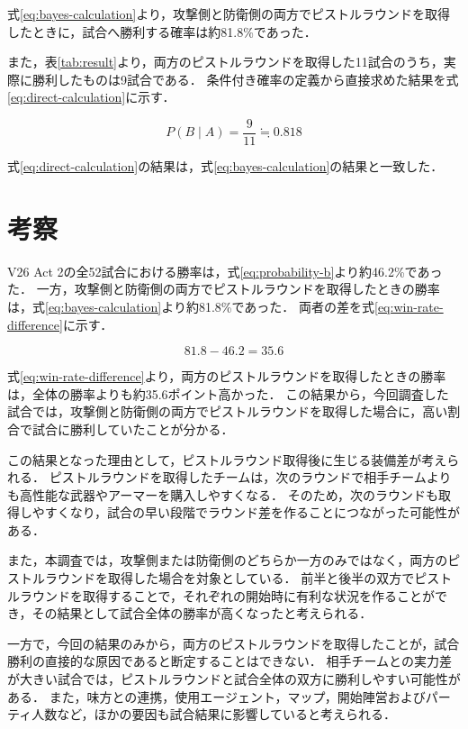\documentclass[titlepage,a4paper]{jsarticle}
\begin{document}
式\eqref{eq:bayes-calculation}より，攻撃側と防衛側の両方でピストルラウンドを取得したときに，試合へ勝利する確率は約81.8\%であった．

また，表\ref{tab:result}より，両方のピストルラウンドを取得した11試合のうち，実際に勝利したものは9試合である．
条件付き確率の定義から直接求めた結果を式\eqref{eq:direct-calculation}に示す．

\begin{equation}
  P(B \mid A)
  =
  \frac{9}{11}
  \fallingdotseq
  0.818
  \label{eq:direct-calculation}
\end{equation}

式\eqref{eq:direct-calculation}の結果は，式\eqref{eq:bayes-calculation}の結果と一致した．


\section{考察}

V26 Act 2の全52試合における勝率は，式\eqref{eq:probability-b}より約46.2\%であった．
一方，攻撃側と防衛側の両方でピストルラウンドを取得したときの勝率は，式\eqref{eq:bayes-calculation}より約81.8\%であった．
両者の差を式\eqref{eq:win-rate-difference}に示す．

\begin{equation}
  81.8 - 46.2 = 35.6
  \label{eq:win-rate-difference}
\end{equation}

式\eqref{eq:win-rate-difference}より，両方のピストルラウンドを取得したときの勝率は，全体の勝率よりも約35.6ポイント高かった．
この結果から，今回調査した試合では，攻撃側と防衛側の両方でピストルラウンドを取得した場合に，高い割合で試合に勝利していたことが分かる．

この結果となった理由として，ピストルラウンド取得後に生じる装備差が考えられる．
ピストルラウンドを取得したチームは，次のラウンドで相手チームよりも高性能な武器やアーマーを購入しやすくなる．
そのため，次のラウンドも取得しやすくなり，試合の早い段階でラウンド差を作ることにつながった可能性がある．

また，本調査では，攻撃側または防衛側のどちらか一方のみではなく，両方のピストルラウンドを取得した場合を対象としている．
前半と後半の双方でピストルラウンドを取得することで，それぞれの開始時に有利な状況を作ることができ，その結果として試合全体の勝率が高くなったと考えられる．

一方で，今回の結果のみから，両方のピストルラウンドを取得したことが，試合勝利の直接的な原因であると断定することはできない．
相手チームとの実力差が大きい試合では，ピストルラウンドと試合全体の双方に勝利しやすい可能性がある．
また，味方との連携，使用エージェント，マップ，開始陣営およびパーティ人数など，ほかの要因も試合結果に影響していると考えられる．
\end{document}
